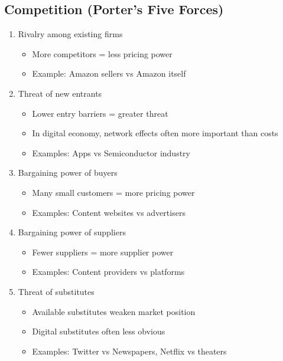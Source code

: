 \subsection{Competition (Porter's Five Forces)}

\begin{enumerate}
    \item Rivalry among existing firms
          \begin{itemize}
              \item More competitors = less pricing power
              \item Example: Amazon sellers vs Amazon itself
          \end{itemize}

    \item Threat of new entrants
          \begin{itemize}
              \item Lower entry barriers = greater threat
              \item In digital economy, network effects often more important than costs
              \item Examples: Apps vs Semiconductor industry
          \end{itemize}

    \item Bargaining power of buyers
          \begin{itemize}
              \item Many small customers = more pricing power
              \item Examples: Content websites vs advertisers
          \end{itemize}

    \item Bargaining power of suppliers
          \begin{itemize}
              \item Fewer suppliers = more supplier power
              \item Examples: Content providers vs platforms
          \end{itemize}

    \item Threat of substitutes
          \begin{itemize}
              \item Available substitutes weaken market position
              \item Digital substitutes often less obvious
              \item Examples: Twitter vs Newspapers, Netflix vs theaters
          \end{itemize}
\end{enumerate}